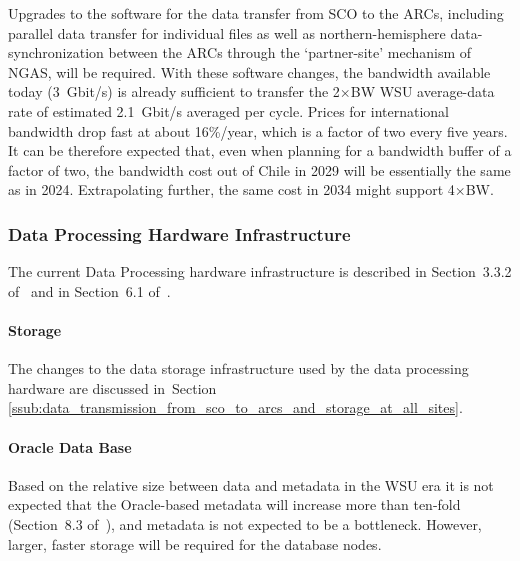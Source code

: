 Upgrades to the software for the data transfer from SCO to the ARCs, including parallel data transfer for individual files as well as northern-hemisphere data-synchronization between the ARCs through the `partner-site' mechanism of NGAS, will be required.  With these software changes, the bandwidth available today (3~Gbit/s) is already sufficient to transfer the 2$\times$BW WSU average-data rate of estimated 2.1~Gbit/s averaged per cycle. Prices for international bandwidth drop fast at about 16\%/year, which is a factor of two every five years. It can be therefore expected that, even when planning for a bandwidth buffer of a factor of two, the bandwidth cost out of Chile in 2029 will be essentially the same as in 2024.  Extrapolating further, the same cost in 2034 might support 4$\times$BW.



\subsubsection{Data Processing Hardware Infrastructure} %
\label{ssub:data_processing_hardware_infrastructure}

The current Data Processing hardware infrastructure is described in Section~3.3.2 of~\cite{dtas} and in Section~6.1 of~\cite{dpda}.

\paragraph{Storage} %
\label{dp_hw_storage}

The changes to the data storage infrastructure used by the data processing hardware are discussed in~Section \ref{ssub:data_transmission_from_sco_to_arcs_and_storage_at_all_sites}.


\paragraph{Oracle Data Base} %
\label{par:oracle_data_base}

Based on the relative size between data and metadata in the WSU era it is not expected that the Oracle-based metadata will increase more than ten-fold (Section~8.3 of~\cite{dtas}), and metadata is not expected to be a bottleneck. However, larger, faster storage will be required for the database nodes.

